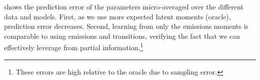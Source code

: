 
shows the prediction error of the parameters
micro-averaged over the different data and models.  First, as we use
more expected latent moments (oracle), prediction error decreases.  Second,
learning from only the emissions moments is comparable
to using emissions and transitions, verifying the fact that
we can effectively leverage from partial information.\footnote{
These errors are high relative to the oracle due to sampling error.}




